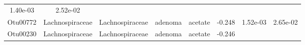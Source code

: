 \documentclass[11pt,]{article}
\begin{document}
\begin{longtable}[]{@{}cccccccc@{}}
\begin{minipage}[t]{0.08\columnwidth}
1.40e-03\strut
\end{minipage} & \begin{minipage}[t]{0.08\columnwidth}\centering\strut
2.52e-02\strut
\end{minipage}\tabularnewline
\begin{minipage}[t]{0.08\columnwidth}\centering\strut
Otu00772\strut
\end{minipage} & \begin{minipage}[t]{0.15\columnwidth}\centering\strut
Lachnospiraceae\strut
\end{minipage} & \begin{minipage}[t]{0.15\columnwidth}\centering\strut
Lachnospiraceae\strut
\end{minipage} & \begin{minipage}[t]{0.08\columnwidth}\centering\strut
adenoma\strut
\end{minipage} & \begin{minipage}[t]{0.09\columnwidth}\centering\strut
acetate\strut
\end{minipage} & \begin{minipage}[t]{0.07\columnwidth}\centering\strut
-0.248\strut
\end{minipage} & \begin{minipage}[t]{0.08\columnwidth}\centering\strut
1.52e-03\strut
\end{minipage} & \begin{minipage}[t]{0.08\columnwidth}\centering\strut
2.65e-02\strut
\end{minipage}\tabularnewline
\begin{minipage}[t]{0.08\columnwidth}\centering\strut
Otu00230\strut
\end{minipage} & \begin{minipage}[t]{0.15\columnwidth}\centering\strut
Lachnospiraceae\strut
\end{minipage} & \begin{minipage}[t]{0.15\columnwidth}\centering\strut
Lachnospiraceae\strut
\end{minipage} & \begin{minipage}[t]{0.08\columnwidth}\centering\strut
adenoma\strut
\end{minipage} & \begin{minipage}[t]{0.09\columnwidth}\centering\strut
acetate\strut
\end{minipage} & \begin{minipage}[t]{0.07\columnwidth}\centering\strut
-0.246\strut
\end{minipage} & \begin{minipage}[t]{0.08\columnwidth}\centering\strut

\end{minipage}
\end{longtable}
\end{document}
